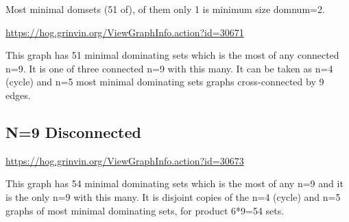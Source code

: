 \documentclass{article}
\begin{document}
Most minimal domsets (51 of), of them only 1 is minimum size domnum=2.

\url{https://hog.grinvin.org/ViewGraphInfo.action?id=30671}

\smallskip

This graph has 51 minimal dominating sets which is the most of any
connected n=9.  It is one of three connected n=9 with this many.  It
can be taken as n=4 (cycle) and n=5 most minimal dominating sets
graphs cross-connected by 9 edges.

\smallskip

\begin{center}
\end{center}

\subsection{N=9 Disconnected}

\url{https://hog.grinvin.org/ViewGraphInfo.action?id=30673}

\smallskip

This graph has 54 minimal dominating sets which is the most of any n=9
and it is the only n=9 with this many.  It is disjoint copies of the
n=4 (cycle) and n=5 graphs of most minimal dominating sets, for
product 6*9=54 sets.
\end{document}
